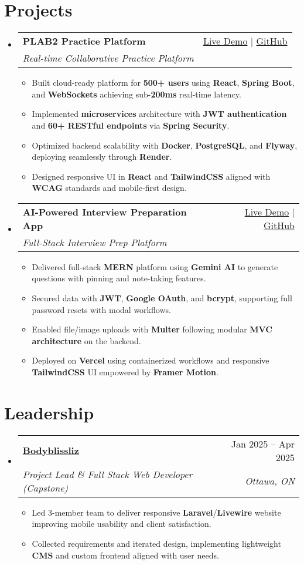 \documentclass[letterpaper,11pt]{article}
\makeatletter
\newcommand{\resumeItem}[1]{\item\small{#1 \vspace{-2pt}}}
\newcommand{\resumeSubheading}[4]{
  \vspace{-1pt}\item
    \begin{tabular*}{0.97\textwidth}[t]{l@{\extracolsep{\fill}}r}
      \textbf{#1} & #2 \\
      \textit{\small#3} & \textit{\small #4} \\
    \end{tabular*}\vspace{-5pt}
}
\newcommand{\resumeSubHeadingListStart}{\begin{itemize}[leftmargin=*]}
\newcommand{\resumeSubHeadingListEnd}{\end{itemize}}
\newcommand{\resumeItemListStart}{\begin{itemize}}
\newcommand{\resumeItemListEnd}{\end{itemize}\vspace{-5pt}}
\makeatother
\begin{document}
\section{Projects}
  \resumeSubHeadingListStart
    \resumeSubheading
      {\textbf{PLAB2 Practice Platform}}{\href{https://plab2practice.com}{Live Demo} | \href{https://github.com/altansaid/plab2projectnew}{GitHub}}
      {Real-time Collaborative Practice Platform}{}
      \resumeItemListStart
        \resumeItem{Built cloud-ready platform for \textbf{500+ users} using \textbf{React}, \textbf{Spring Boot}, and \textbf{WebSockets} achieving sub-\textbf{200ms} real-time latency.}
        \resumeItem{Implemented \textbf{microservices} architecture with \textbf{JWT authentication} and \textbf{60+ RESTful endpoints} via \textbf{Spring Security}.}
        \resumeItem{Optimized backend scalability with \textbf{Docker}, \textbf{PostgreSQL}, and \textbf{Flyway}, deploying seamlessly through \textbf{Render}.}
        \resumeItem{Designed responsive UI in \textbf{React} and \textbf{TailwindCSS} aligned with \textbf{WCAG} standards and mobile-first design.}
      \resumeItemListEnd

    \resumeSubheading
      {\textbf{AI-Powered Interview Preparation App}}{\href{https://interviewcoach-ai.vercel.app}{Live Demo} | \href{https://github.com/altansaid/interviewcoach-ai}{GitHub}}
      {Full-Stack Interview Prep Platform}{}
      \resumeItemListStart
        \resumeItem{Delivered full-stack \textbf{MERN} platform using \textbf{Gemini AI} to generate questions with pinning and note-taking features.}
        \resumeItem{Secured data with \textbf{JWT}, \textbf{Google OAuth}, and \textbf{bcrypt}, supporting full password resets with modal workflows.}
        \resumeItem{Enabled file/image uploads with \textbf{Multer} following modular \textbf{MVC architecture} on the backend.}
        \resumeItem{Deployed on \textbf{Vercel} using containerized workflows and responsive \textbf{TailwindCSS} UI empowered by \textbf{Framer Motion}.}
      \resumeItemListEnd
  \resumeSubHeadingListEnd

\section{Leadership}
  \resumeSubHeadingListStart
    \resumeSubheading
      {\href{https://www.bodyblissliz.com}{Bodyblissliz}}{Jan 2025 -- Apr 2025}
      {Project Lead \& Full Stack Web Developer (Capstone)}{Ottawa, ON}
      \resumeItemListStart
        \resumeItem{Led 3-member team to deliver responsive \textbf{Laravel}/\textbf{Livewire} website improving mobile usability and client satisfaction.}
        \resumeItem{Collected requirements and iterated design, implementing lightweight \textbf{CMS} and custom frontend aligned with user needs.}
      \resumeItemListEnd
  \resumeSubHeadingListEnd
\end{document}
